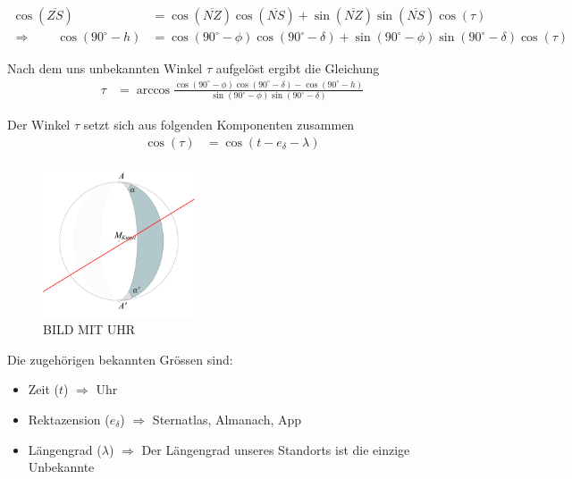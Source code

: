 \begin{refsection}
\begin{align*}
\cos(\overline{ZS}) &= \cos(\overline{NZ}) \cos(\overline{NS}) + \sin(\overline{NZ}) \sin(\overline{NS}) \cos(\tau) \\
\Rightarrow \quad \quad
\cos(90^{\circ} - h) &= \cos(90^{\circ} - \phi) \cos(90^{\circ} - \delta) + \sin(90^{\circ} - \phi)\sin(90^{\circ} - \delta) \cos(\tau)
\end{align*}

Nach dem uns unbekannten Winkel $\tau$ aufgelöst ergibt die Gleichung
\begin{align*}
\tau &= \arccos 
\frac{ \cos(90^{\circ} - \phi) \cos(90^{\circ} - \delta) - \cos(90^{\circ} - h)} {\sin(90^{\circ} - \phi)\sin(90^{\circ} - \delta)}
\end{align*}

Der Winkel $\tau$ setzt sich aus folgenden Komponenten zusammen
\begin{align*}
\cos (\tau) &= \cos (t - e_\delta - \lambda) 
\end{align*}

\begin{figure}[htbp]
\centering
\includegraphics[width=0.4\textwidth]{kugel/Zweieck.jpg}
\caption{BILD MIT UHR}
\end{figure}

Die zugehörigen bekannten Grössen sind:
\begin{itemize}
\item Zeit ($t$) $\Rightarrow$ Uhr
\item Rektazension ($e_\delta$) $\Rightarrow$ Sternatlas, Almanach, App 
\item Längengrad ($\lambda$) $\Rightarrow$ Der Längengrad unseres Standorts ist die einzige Unbekannte
\end{itemize}



\end{refsection}
